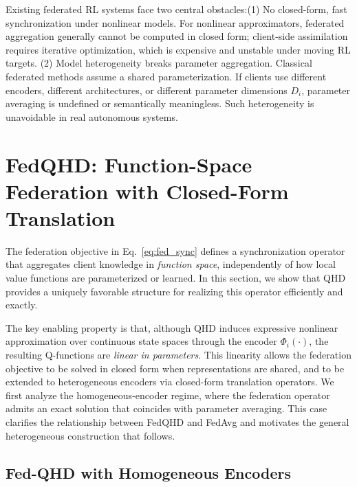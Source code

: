 Existing federated RL systems face two central obstacles:{(1) No closed-form, fast synchronization under nonlinear models.} For nonlinear approximators, federated aggregation generally cannot be computed in closed form; client-side assimilation requires iterative optimization, which is expensive and unstable under moving RL targets. {(2) Model heterogeneity breaks parameter aggregation.} Classical federated methods assume a shared parameterization. If clients use different encoders, different architectures, or different parameter dimensions $D_i$, parameter averaging is undefined or semantically meaningless. Such heterogeneity is unavoidable in real autonomous systems.



\section{FedQHD: Function-Space Federation with Closed-Form Translation}
\label{sec:methodology}
The federation objective in Eq.~\eqref{eq:fed_sync} defines a synchronization operator that aggregates client knowledge in \emph{function space}, independently of how local value functions are parameterized or learned. In this section, we show that QHD provides a uniquely favorable structure for realizing this operator efficiently and exactly.

The key enabling property is that, although QHD induces expressive nonlinear approximation over continuous state spaces through the encoder $\Phi_i(\cdot)$, the resulting Q-functions are \emph{linear in parameters}. This linearity allows the federation objective to be solved in closed form when representations are shared, and to be extended to heterogeneous encoders via closed-form translation operators. We first analyze the homogeneous-encoder regime, where the federation operator admits an exact solution that coincides with parameter averaging. This case clarifies the relationship between FedQHD and FedAvg and motivates the general heterogeneous construction that follows.

\subsection{Fed-QHD with Homogeneous Encoders}
\label{sec:fedqhd_homogeneous}

